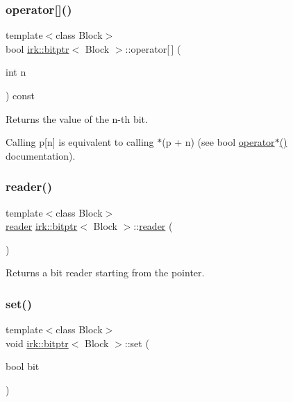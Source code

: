 \subsubsection{\texorpdfstring{operator[]()}{operator[]()}\hspace{0.1cm}{\footnotesize\ttfamily [2/2]}}
{\footnotesize\ttfamily template$<$class Block$>$ \\
bool \mbox{\hyperlink{classirk_1_1bitptr}{irk\+::bitptr}}$<$ Block $>$\+::operator\mbox{[}$\,$\mbox{]} (\begin{DoxyParamCaption}\item[{int}]{n }\end{DoxyParamCaption}) const\hspace{0.3cm}{\ttfamily [inline]}}



Returns the value of the {\ttfamily n}-\/th bit. 

Calling p\mbox{[}n\mbox{]} is equivalent to calling $\ast$(p + n) (see {\ttfamily bool \mbox{\hyperlink{classirk_1_1bitptr_a6676fe4fc076f0cb53587ea48d8634c3}{operator$\ast$()}}} documentation). \mbox{\label{classirk_1_1bitptr_a4505dc024807e2b041ffdc910fae1189}} 
\subsubsection{\texorpdfstring{reader()}{reader()}}
{\footnotesize\ttfamily template$<$class Block$>$ \\
\mbox{\hyperlink{structirk_1_1bitptr_1_1reader}{reader}} \mbox{\hyperlink{classirk_1_1bitptr}{irk\+::bitptr}}$<$ Block $>$\+::\mbox{\hyperlink{structirk_1_1bitptr_1_1reader}{reader}} (\begin{DoxyParamCaption}{ }\end{DoxyParamCaption})\hspace{0.3cm}{\ttfamily [inline]}}



Returns a bit reader starting from the pointer. 

\mbox{\label{classirk_1_1bitptr_ab690150f670134eb879fceb83d892073}} 
\subsubsection{\texorpdfstring{set()}{set()}\hspace{0.1cm}{\footnotesize\ttfamily [1/2]}}
{\footnotesize\ttfamily template$<$class Block$>$ \\
void \mbox{\hyperlink{classirk_1_1bitptr}{irk\+::bitptr}}$<$ Block $>$\+::set (\begin{DoxyParamCaption}\item[{bool}]{bit }\end{DoxyParamCaption})\hspace{0.3cm}{\ttfamily [inline]}}



